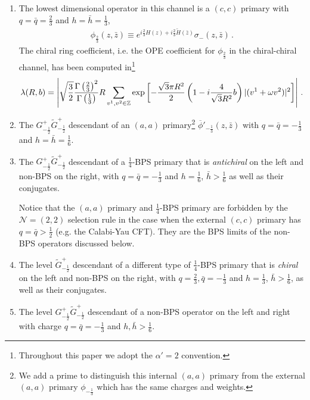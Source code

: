 \documentclass[12pt]{article}
\begin{document}
\begin{enumerate}
\item
The lowest dimensional operator in this channel is a $(c,c)$ primary with $q=\bar q=\frac23$ and $h=\bar h=\frac13$,
\begin{align}
\phi_{\frac23}(z,\bar z) \equiv e^{ i\frac 23 H(z)  +i  \frac 23 \tilde H(\bar z) }  \sigma_{-}(z,\bar z)\,.
\end{align}
The chiral ring coefficient, i.e. the OPE coefficient for $\phi_{\frac23}$ in the chiral-chiral channel,  has been computed in\footnote{Throughout this paper we adopt the $\alpha'=2$ convention.
} \cite{Dixon:1986qv,Chun:1989se}
\begin{align}\label{T2Z3chiralring}
\lambda(R,b)   =\left|   \sqrt{3\over2} {\Gamma\left( \frac23 \right)^2\over \Gamma\left( \frac13\right)} R \sum_{v^1,v^2\in \mathbb{Z}} \exp\left[   - {\sqrt{3} \pi R^2 \over 2 } \left(1-i {4 \over \sqrt{3}R^2} b\right) |(v^1 + \omega v^2)|^2\right]\right|\,.
\end{align}

\item  The $G^+_{-\frac12}\tilde G^+_{-\frac12}$ descendant of an $(a,a)$ primary\footnote{We add a prime to distinguish this internal $(a,a)$ primary from the external $(a,a)$ primary $\phi_{-\frac13}$ which has the same charges and weights.}  $\overline\phi'_{-\frac13}(z,\bar z)$ with $q=\bar q=-\frac13$ and $h=\bar h = \frac16$. 
 
 
 
 \item The  $G^+_{-\frac12}\tilde G^+_{-\frac12}$ descendant of a $\frac14$-BPS primary that is \textit{antichiral} on the left and non-BPS on the right, with $q=\bar q=-\frac13$ and $h=\frac16$, $\bar h > \frac16$ as well as their conjugates.

Notice that the $(a,a)$ primary and $\frac14$-BPS primary are forbidden by the $\mathcal{N}=(2,2)$ selection rule in the case when the external $(c,c)$ primary has $q=\bar q>\frac12$ (e.g.   the Calabi-Yau CFT).  They are the BPS limits of the non-BPS operators discussed below.





\item The level $\tilde G^+_{-\frac12}$ descendant of a different type of $\frac14$-BPS primary that is \textit{chiral} on the left and non-BPS on the right, with $q=\frac23, \bar q=-\frac13$ and $h=\frac13$, $\bar h > \frac16$, as well as their conjugates.  

  \item The level $G^+_{-\frac12}\tilde G^+_{-\frac12}$ descendant of a non-BPS operator  on the left and right with charge $q=\bar q= -\frac13$ and $h,\bar h> \frac 16$.  
  \end{enumerate}
  
\end{document}
